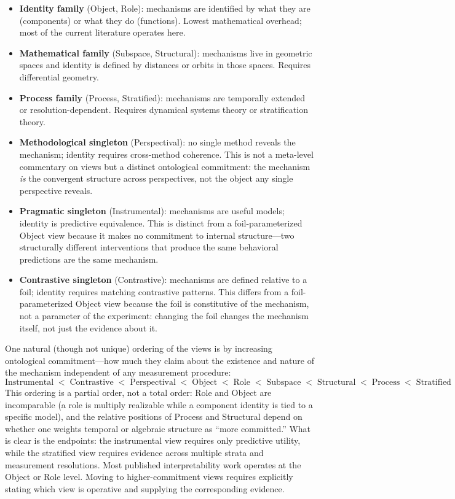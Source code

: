 \documentclass{article}
\begin{document}
\begin{itemize}[leftmargin=*]
\item \textbf{Identity family} (Object, Role): mechanisms are identified
      by what they are (components) or what they do (functions).  Lowest
      mathematical overhead; most of the current literature operates here.
\item \textbf{Mathematical family} (Subspace, Structural): mechanisms
      live in geometric spaces and identity is defined by distances or
      orbits in those spaces.  Requires differential geometry.
\item \textbf{Process family} (Process, Stratified): mechanisms are
      temporally extended or resolution-dependent.  Requires dynamical
      systems theory or stratification theory.
\item \textbf{Methodological singleton} (Perspectival): no single
      method reveals the mechanism; identity requires cross-method
      coherence.  This is not a meta-level commentary on views but a distinct ontological commitment: the mechanism \emph{is} the convergent structure across perspectives, not the object any single perspective reveals.
\item \textbf{Pragmatic singleton} (Instrumental): mechanisms are useful
      models; identity is predictive equivalence.  This is distinct from a foil-parameterized Object view because it makes no commitment to internal structure---two structurally different interventions that produce the same behavioral predictions are the same mechanism.
\item \textbf{Contrastive singleton} (Contrastive): mechanisms are
      defined relative to a foil; identity requires matching contrastive
      patterns.  This differs from a foil-parameterized Object view because the foil is constitutive of the mechanism, not a parameter of the experiment: changing the foil changes the mechanism itself, not just the evidence about it.
\end{itemize}

One natural (though not unique) ordering of the views is by
increasing ontological commitment---how much they claim about the
existence and nature of the mechanism independent of any measurement
procedure:
\[
\text{Instrumental} \;<\; \text{Contrastive} \;<\; \text{Perspectival}
\;<\; \text{Object} \;<\; \text{Role} \;<\; \text{Subspace} \;<\;
\text{Structural} \;<\; \text{Process} \;<\; \text{Stratified}
\]
This ordering is a partial order, not a total order: Role and Object are incomparable (a role is multiply realizable while a component identity is tied to a specific model), and the relative positions of Process and Structural depend on whether one weights temporal or algebraic structure as ``more committed.''  What is clear is the endpoints: the instrumental view requires only predictive
utility, while the stratified view requires evidence across multiple
strata and measurement resolutions.  Most published interpretability
work operates at the Object or Role level.  Moving to
higher-commitment views requires explicitly stating which view is
operative and supplying the corresponding evidence.
\end{document}

